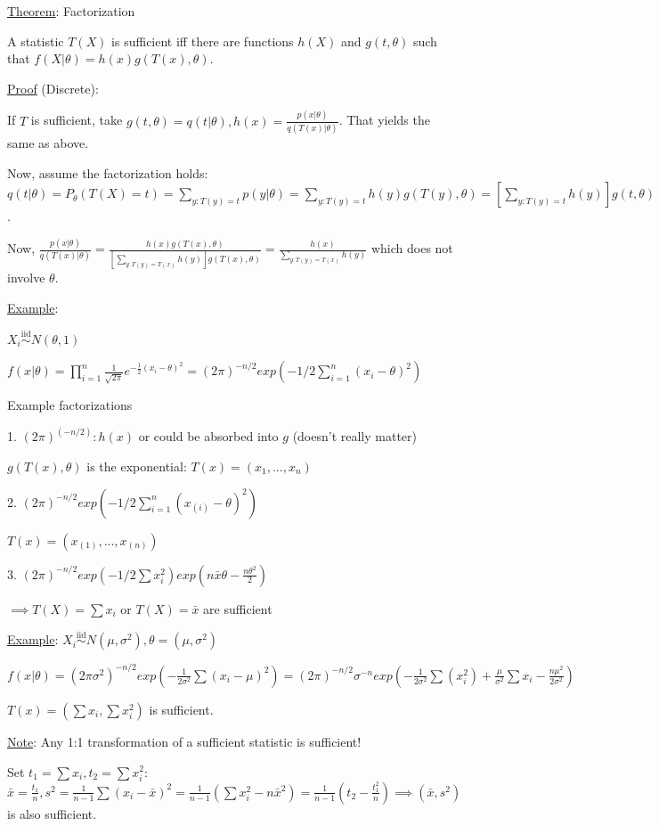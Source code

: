 \documentclass{article}
\let\Oldsum=\sum
\let\Oldprod=\prod
\renewcommand{\sum}{\Oldsum\limits}
\renewcommand{\prod}{\Oldprod\limits}
\newcommand{\iiddist}{\overset{\mathrm{iid}}{\sim}}
\begin{document}
\underline{Theorem}: Factorization

A statistic $T(X)$ is sufficient iff there are functions $h(X)$ and $g(t, \theta)$ such that $f(X|\theta) = h(x)g(T(x), \theta)$.

\underline{Proof} (Discrete): 

If $T$ is sufficient, take $g(t, \theta) = q(t|\theta), h(x) = \frac{p(x|\theta)}{q(T(x)|\theta)}$. That yields the same as above.

Now, assume the factorization holds: $q(t|\theta) = P_{\theta}(T(X) = t) = \sum_{y:T(y)=t}p(y|\theta) = \sum_{y:T(y)=t}h(y)g(T(y), \theta) = [\sum_{y:T(y)=t}h(y)]g(t, \theta)$.

Now, $\frac{p(x|\theta)}{q(T(x)|\theta)} = \frac{h(x)g(T(x), \theta)}{[\sum_{y:T(y)=T(x)}h(y)]g(T(x), \theta)} = \frac{h(x)}{\sum_{y:T(y)=T(x)}h(y)}$ which does not involve $\theta$.

\underline{Example}:

$X_i \iiddist N(\theta, 1)$

$f(x|\theta) = \prod_{i=1}^n \frac{1}{\sqrt{2\pi}}e^{-\frac{1}{2}(x_i - \theta)^2} = (2\pi)^{-n/2}exp(-1/2\sum_{i=1}^n(x_i - \theta)^2)$

Example factorizations

1. 
$(2\pi)^(-n/2): h(x)$ or could be absorbed into $g$ (doesn't really matter)

$g(T(x), \theta)$ is the exponential: $T(x) = (x_1, ..., x_n)$

2. $(2\pi)^{-n/2}exp(-1/2\sum_{i=1}^n(x_{(i)} - \theta)^2)$

$T(x) = (x_{(1)}, ..., x_{(n)})$

3. $(2\pi)^{-n/2}exp(-1/2 \sum x_i^2)exp(n \bar{x}\theta - \frac{n\theta^2}{2})$

$\implies T(X) = \sum x_i$ or $T(X) = \bar{x}$ are sufficient

\underline{Example}: $X_i \iiddist N(\mu, \sigma^2), \theta = (\mu, \sigma^2)$

$f(x|\theta) = (2\pi\sigma^2)^{-n/2}exp(-\frac{1}{2\sigma^2}\sum(x_i-\mu)^2) = (2\pi)^{-n/2}\sigma^{-n}exp(-\frac{1}{2\sigma^2}\sum(x_i^2) + \frac{\mu}{\sigma^2}\sum x_i - \frac{n\mu^2}{2\sigma^2})$

$T(x) = (\sum x_i, \sum x_i^2)$ is sufficient.

\underline{Note}: Any 1:1 transformation of a sufficient statistic is sufficient!

Set $t_1 = \sum x_i, t_2 = \sum x_i^2$: $\bar{x} = \frac{t_1}{n}, s^2 = \frac{1}{n-1}\sum(x_i - \bar{x})^2 = \frac{1}{n-1}(\sum x_i^2 - n\bar{x}^2) = \frac{1}{n-1}(t_2 - \frac{t_1^2}{n}) \implies (\bar{x}, s^2)$ is also sufficient.
\end{document}
